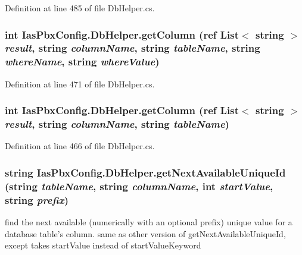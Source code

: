 Definition at line 485 of file DbHelper.cs.\hypertarget{class_ias_pbx_config_1_1_db_helper_aee81007408e5c21c279bc01afb4b8cff}{
\subsubsection[{getColumn}]{\setlength{\rightskip}{0pt plus 5cm}int IasPbxConfig.DbHelper.getColumn (ref List$<$ string $>$ {\em result}, \/  string {\em columnName}, \/  string {\em tableName}, \/  string {\em whereName}, \/  string {\em whereValue})}}
\label{class_ias_pbx_config_1_1_db_helper_aee81007408e5c21c279bc01afb4b8cff}


Definition at line 471 of file DbHelper.cs.\hypertarget{class_ias_pbx_config_1_1_db_helper_a52d4f0ce67921374957b1468cd54b01f}{
\subsubsection[{getColumn}]{\setlength{\rightskip}{0pt plus 5cm}int IasPbxConfig.DbHelper.getColumn (ref List$<$ string $>$ {\em result}, \/  string {\em columnName}, \/  string {\em tableName})}}
\label{class_ias_pbx_config_1_1_db_helper_a52d4f0ce67921374957b1468cd54b01f}


Definition at line 466 of file DbHelper.cs.\hypertarget{class_ias_pbx_config_1_1_db_helper_ae67ee3d912d67babce90e7ef22d1ef75}{
\subsubsection[{getNextAvailableUniqueId}]{\setlength{\rightskip}{0pt plus 5cm}string IasPbxConfig.DbHelper.getNextAvailableUniqueId (string {\em tableName}, \/  string {\em columnName}, \/  int {\em startValue}, \/  string {\em prefix})}}
\label{class_ias_pbx_config_1_1_db_helper_ae67ee3d912d67babce90e7ef22d1ef75}


find the next available (numerically with an optional prefix) unique value for a database table's column. same as other version of getNextAvailableUniqueId, except takes startValue instead of startValueKeyword


